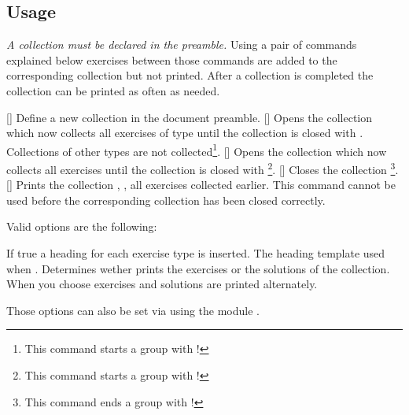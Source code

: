 \documentclass{xsim-manual}
\begin{document}
\subsection{Usage}
\emph{A collection must be declared in the preamble.}  Using a pair of
commands explained below exercises between those commands are added to the
corresponding collection but not printed.  After a collection is completed the
collection can be printed as often as needed.
\begin{commands}
  []
    Define a new collection  in the document preamble.
  []
    Opens the collection  which now collects all
    exercises of type  until the collection is closed with
    .  Collections of other types are not
    collected\footnote{This command starts a group with
      !}.
  []
    Opens the collection  which now collects all
    exercises until the collection is closed with
    \footnote{This command starts a group with
      !}.
  []
    Closes the collection \footnote{This command ends
      a group with !}.
  []
    Prints the collection , \ie, all exercises collected
    earlier.  This command cannot be used before the corresponding collection
    has been closed correctly.
\end{commands}

Valid options are the following:
\begin{options}
    If true a heading for each exercise type is inserted.
    The heading template used when .
    Determines wether  prints the exercises or the
    solutions of the collection.  When you choose  exercises and
    solutions are printed alternately.
\end{options}

Those options can also be set via  using the module
.
\end{document}
